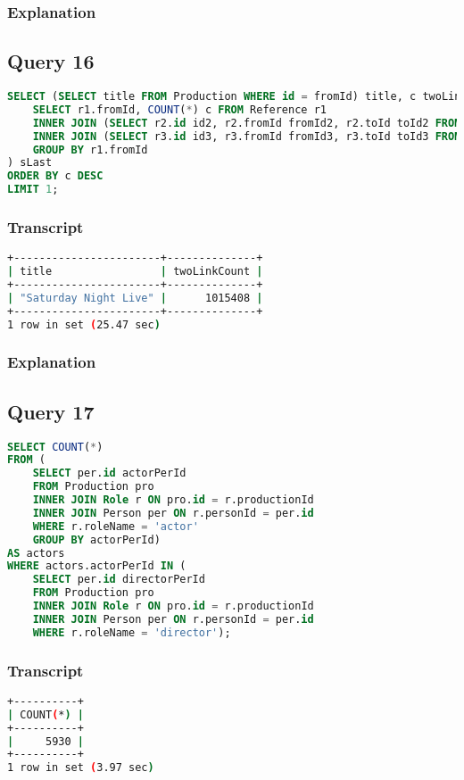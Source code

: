 \subsubsection{Explanation}


\subsection{Query 16}
\begin{lstlisting}[language=sql]
SELECT (SELECT title FROM Production WHERE id = fromId) title, c twoLinkCount FROM (
	SELECT r1.fromId, COUNT(*) c FROM Reference r1
	INNER JOIN (SELECT r2.id id2, r2.fromId fromId2, r2.toId toId2 FROM Reference r2) s1 ON r1.toId = s1.fromId2
	INNER JOIN (SELECT r3.id id3, r3.fromId fromId3, r3.toId toId3 FROM Reference r3) s2 ON s1.toId2 = s2.fromId3
	GROUP BY r1.fromId
) sLast
ORDER BY c DESC
LIMIT 1;
\end{lstlisting}

\subsubsection{Transcript}
\begin{lstlisting}[language=bash]
+-----------------------+--------------+
| title                 | twoLinkCount |
+-----------------------+--------------+
| "Saturday Night Live" |      1015408 |
+-----------------------+--------------+
1 row in set (25.47 sec)
\end{lstlisting}

\subsubsection{Explanation}


\subsection{Query 17}
\begin{lstlisting}[language=sql]
SELECT COUNT(*)
FROM (
	SELECT per.id actorPerId
	FROM Production pro
	INNER JOIN Role r ON pro.id = r.productionId
	INNER JOIN Person per ON r.personId = per.id
	WHERE r.roleName = 'actor'
	GROUP BY actorPerId)
AS actors
WHERE actors.actorPerId IN (
	SELECT per.id directorPerId
	FROM Production pro
	INNER JOIN Role r ON pro.id = r.productionId
	INNER JOIN Person per ON r.personId = per.id
	WHERE r.roleName = 'director');
\end{lstlisting}

\subsubsection{Transcript}
\begin{lstlisting}[language=bash]
+----------+
| COUNT(*) |
+----------+
|     5930 |
+----------+
1 row in set (3.97 sec)
\end{lstlisting}

